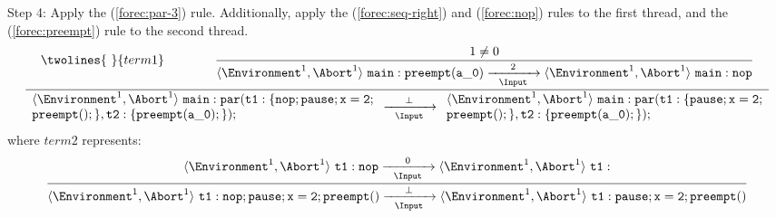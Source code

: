 \noindent
Step 4: Apply the (\ref{forec:par-3}) rule. Additionally, apply the 
(\ref{forec:seq-right}) and (\ref{forec:nop}) rules to the first
thread, and the (\ref{forec:preempt}) rule to the second thread.
\begin{equation*}
	\frac{
			\twolines{
				~
			}{
				term1
			}
			\qquad
			\qquad
		\dfrac{
				1 \neq 0
			}{
				\langle \Environment^1, \Abort^1 \rangle ~ \mathtt{main: preempt(a\_0)}
					\xrightarrow[~~\Input~~]{2} 
				\langle \Environment^1, \Abort^1 \rangle ~ \mathtt{main: nop}
			}
		}{
			\begin{array}{l}
				\langle \Environment^1, \Abort^1 \rangle ~ \mathtt{main: par( t1:\{nop; pause;x=2;}	\\
				\mathtt{preempt();\}, t2:\{preempt(a\_0);\} );}										\\
			\end{array}
				\xrightarrow[~~\Input~~]{\bot} 
			\begin{array}{l}
				\langle \Environment^1, \Abort^1 \rangle ~ \mathtt{main: par( t1:\{pause;x=2;}		\\
				\mathtt{preempt();\}, t2:\{preempt(a\_0);\} );}										\\
			\end{array}
		}
\end{equation*}
where $term2$ represents:
\begin{equation*}
	\frac{
			\langle \Environment^1, \Abort^1 \rangle ~ \mathtt{t1: nop}
				\xrightarrow[~~\Input~~]{0} 
			\langle \Environment^1, \Abort^1 \rangle ~ \mathtt{t1: }
		}{
			\langle \Environment^1, \Abort^1 \rangle ~ \mathtt{t1: nop; pause;x=2; preempt()}
				\xrightarrow[~~\Input~~]{\bot} 
			\langle \Environment^1, \Abort^1 \rangle ~ \mathtt{t1: pause;x=2; preempt()}
		}
\end{equation*}

